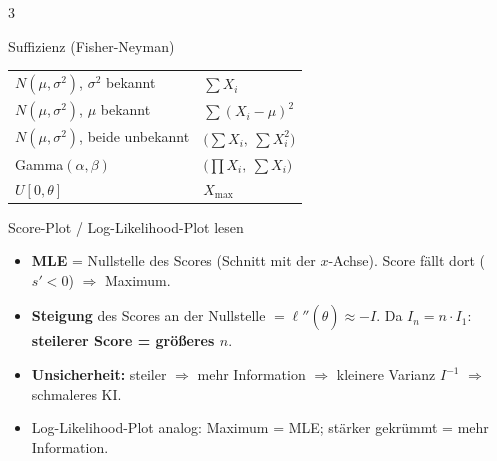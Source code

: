 \documentclass[8pt,a4paper,landscape]{extarticle}
\newcommand{\ra}{$\Rightarrow$}
\begin{document}
\begin{multicols*}{3}
\begin{wissen}{Suffizienz (Fisher-Neyman)}
\begin{tabularx}{\linewidth}{@{}>{\raggedright\arraybackslash}X>{\raggedright\arraybackslash}p{3.3cm}@{}}
$N(\mu,\sigma^2)$, $\sigma^2$ bekannt & $\sum X_i$ \\
$N(\mu,\sigma^2)$, $\mu$ bekannt & $\sum (X_i-\mu)^2$ \\
$N(\mu,\sigma^2)$, beide unbekannt & $\big(\sum X_i,\ \sum X_i^2\big)$ \\
Gamma$(\alpha,\beta)$ & $\big(\prod X_i,\ \sum X_i\big)$ \\
$U[0,\theta]$ & $X_{\max}$ \\
\end{tabularx}
\end{wissen}
\begin{wissen}{Score-Plot / Log-Likelihood-Plot lesen}
\begin{itemize}
\item \textbf{MLE} = Nullstelle des Scores (Schnitt mit der $x$-Achse). Score fällt dort ($s'<0$) \ra{} Maximum.
\item \textbf{Steigung} des Scores an der Nullstelle $=\ell''(\hat\theta)\approx -I$. Da $I_n=n\cdot I_1$: \textbf{steilerer Score = größeres $n$}.
\item \textbf{Unsicherheit:} steiler \ra{} mehr Information \ra{} kleinere Varianz $I^{-1}$ \ra{} schmaleres KI.
\item Log-Likelihood-Plot analog: Maximum = MLE; stärker gekrümmt = mehr Information.
\end{itemize}
\end{wissen}




\end{multicols*}
\end{document}
